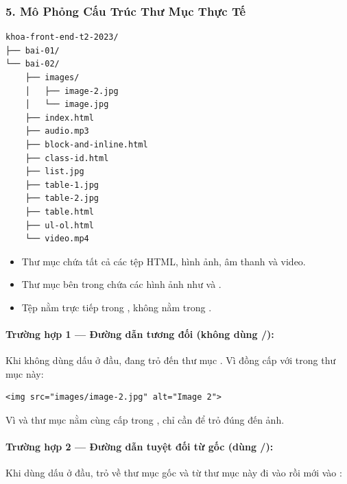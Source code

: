 \subsubsection{5. Mô Phỏng Cấu Trúc Thư Mục Thực Tế}

\begin{codeWindow}
\begin{lstlisting}[language=HTML5]
khoa-front-end-t2-2023/
├── bai-01/
└── bai-02/
    ├── images/
    │   ├── image-2.jpg
    │   └── image.jpg
    ├── index.html
    ├── audio.mp3
    ├── block-and-inline.html
    ├── class-id.html
    ├── list.jpg
    ├── table-1.jpg
    ├── table-2.jpg
    ├── table.html
    ├── ul-ol.html
    └── video.mp4
\end{lstlisting}
\end{codeWindow}

\begin{itemize}[leftmargin=1.5em, itemsep=3pt, parsep=0pt]
    \item Thư mục  chứa tất cả các tệp HTML, hình ảnh, âm thanh và video.
    \item Thư mục  bên trong  chứa các hình ảnh như  và .
    \item Tệp  nằm trực tiếp trong , không nằm trong .
\end{itemize}

\paragraph{Trường hợp 1 — Đường dẫn tương đối (không dùng /):}
Khi không dùng dấu \codeinline{/} ở đầu, đang trỏ đến thư mục . Vì  đồng cấp với  trong thư mục này:

\begin{codeWindow}
\begin{lstlisting}[language=HTML5]
<img src="images/image-2.jpg" alt="Image 2">
\end{lstlisting}
\end{codeWindow}

Vì  và thư mục  nằm cùng cấp trong , chỉ cần  để trỏ đúng đến ảnh.

\paragraph{Trường hợp 2 — Đường dẫn tuyệt đối từ gốc (dùng /):}
Khi dùng dấu \codeinline{/} ở đầu, trỏ về thư mục gốc  và từ thư mục này đi vào  rồi mới vào :

